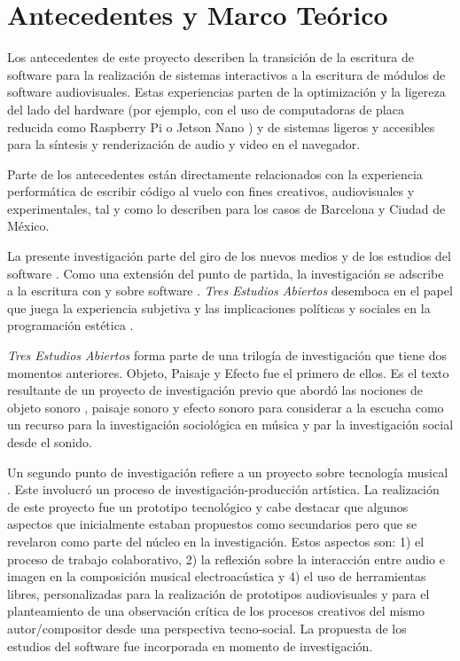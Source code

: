 \section*{Antecedentes y Marco Teórico}

Los antecedentes de este proyecto describen la transición de la escritura de software para la realización de sistemas interactivos a la escritura de módulos de software audiovisuales. Estas experiencias parten de la optimización y la ligereza del lado del hardware (por ejemplo, con el uso de computadoras de placa reducida como Raspberry Pi o Jetson Nano ) y de sistemas ligeros y accesibles para la síntesis y renderización de audio y video en el navegador.

Parte de los antecedentes están directamente relacionados con la experiencia performática de escribir código al vuelo con fines creativos, audiovisuales y experimentales, tal y como lo describen \cite{villasenor} para los casos de Barcelona y Ciudad de México. 

La presente investigación parte del giro de los nuevos medios y de los estudios del software \citep{manovichlanguage}. Como una extensión del punto de partida, la investigación se adscribe a la escritura con y sobre software \citep{aestheticProgramming}. \textit{Tres Estudios Abiertos} desemboca en el papel que juega la experiencia subjetiva y las implicaciones políticas y sociales en la programación estética \citep{speakingCode}. 

\textit{Tres Estudios Abiertos} forma parte de una trilogía de investigación que tiene dos momentos anteriores. Objeto, Paisaje y Efecto \citep{ocelotlLic} fue el primero de ellos. Es el texto resultante de un proyecto de investigación previo que abordó las nociones de objeto sonoro \citep{schaeffer}, paisaje sonoro\citep{schafer1} y efecto sonoro \citep{augoyard} para considerar a la escucha como un recurso para la investigación sociológica en música y par la investigación social desde el sonido. 

Un segundo punto de investigación refiere a un proyecto sobre tecnología musical \citep{ocelotlMas}. Este involucró un proceso de investigación-producción artística. La realización de este proyecto fue un prototipo tecnológico y cabe destacar que algunos aspectos que inicialmente estaban propuestos como secundarios pero que se revelaron como parte del núcleo en la investigación. Estos aspectos son: 1) el proceso de trabajo colaborativo, 2) la reflexión sobre la interacción entre audio e imagen en la composición musical electroacústica y 4) el uso de herramientas libres, personalizadas para la realización de prototipos audiovisuales y para el planteamiento de una observación crítica de los procesos creativos del mismo autor/compositor desde una perspectiva tecno-social. La propuesta de los estudios del software fue incorporada en momento de investigación. 

